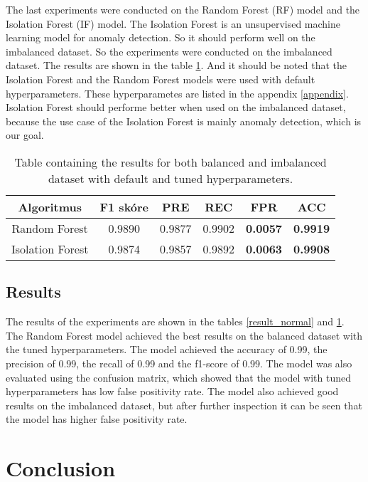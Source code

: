 The last experiments were conducted on the Random Forest (RF) model and the Isolation Forest (IF) model. The Isolation Forest is an unsupervised machine learning model for anomaly detection.
So it should perform well on the imbalanced dataset. So the experiments were conducted on the imbalanced dataset. The results are shown in the table \ref{result_compare}. And it should be noted that the Isolation Forest and the Random Forest models were used with default hyperparameters.
These hyperparametes are listed in the appendix \ref{appendix}. Isolation Forest should performe better when used on the imbalanced dataset, because the use case of the Isolation Forest is mainly anomaly detection, which is our goal.

\begin{table}[h]
    \centering
    \label{result_compare}
    \begin{tabular}{|c|c|c|c|c|c|}
    \hline
    \textbf{Algoritmus} & \textbf{F1 skóre} & \textbf{PRE} & \textbf{REC} & \textbf{FPR} & \textbf{ACC} \\ \hline
    Random Forest       & 0.9890 & 0.9877 & 0.9902 & \textbf{0.0057} & \textbf{0.9919}\\ \hline
    Isolation Forest    & 0.9874 & 0.9857 & 0.9892 & \textbf{0.0063} & \textbf{0.9908}\\ \hline
    \end{tabular}
    \caption{Table containing the results for both balanced and imbalanced dataset with default and tuned hyperparameters.}    
\end{table}

\section{Results}

The results of the experiments are shown in the tables \ref{result_normal} and \ref{result_compare}. The Random Forest model achieved the best results on the balanced dataset with the tuned hyperparameters.
The model achieved the accuracy of 0.99, the precision of 0.99, the recall of 0.99 and the f1-score of 0.99. The model was also evaluated using the confusion matrix, which showed 
that the model with tuned hyperparameters has low false positivity rate. The model also achieved good results on the imbalanced dataset, but after further inspection it can be seen that the model has higher false positivity rate.

\chapter{Conclusion}

